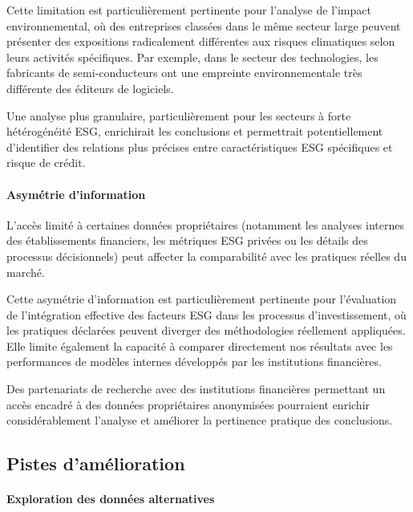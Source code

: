 Cette limitation est particulièrement pertinente pour l'analyse de l'impact environnemental, où des entreprises classées dans le même secteur large peuvent présenter des expositions radicalement différentes aux risques climatiques selon leurs activités spécifiques. Par exemple, dans le secteur des technologies, les fabricants de semi-conducteurs ont une empreinte environnementale très différente des éditeurs de logiciels.

Une analyse plus granulaire, particulièrement pour les secteurs à forte hétérogénéité ESG, enrichirait les conclusions et permettrait potentiellement d'identifier des relations plus précises entre caractéristiques ESG spécifiques et risque de crédit.

\paragraph{Asymétrie d'information} 
L'accès limité à certaines données propriétaires (notamment les analyses internes des établissements financiers, les métriques ESG privées ou les détails des processus décisionnels) peut affecter la comparabilité avec les pratiques réelles du marché.

Cette asymétrie d'information est particulièrement pertinente pour l'évaluation de l'intégration effective des facteurs ESG dans les processus d'investissement, où les pratiques déclarées peuvent diverger des méthodologies réellement appliquées. Elle limite également la capacité à comparer directement nos résultats avec les performances de modèles internes développés par les institutions financières.

Des partenariats de recherche avec des institutions financières permettant un accès encadré à des données propriétaires anonymisées pourraient enrichir considérablement l'analyse et améliorer la pertinence pratique des conclusions.

\subsection*{Pistes d'amélioration}

\paragraph{Exploration des données alternatives} 

